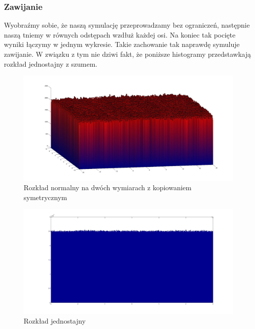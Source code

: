 \documentclass{mini}
\begin{document}
\subsubsection*{Zawijanie}
Wyobraźmy sobie, że naszą symulację przeprowadzamy bez ograniczeń, następnie naszą tniemy w równych odstępach wzdłuż każdej osi. Na koniec tak pocięte wyniki łączymy w jednym wykresie. Takie zachowanie tak naprawdę symuluje zawijanie. W związku z tym nie dziwi fakt, że poniższe histogramy przedstawkają rozkład jednostajny z szumem.
\begin{figure}[H]
\centering
\includegraphics[width=\textwidth]{w_n_10M_2__20_20__10_10_4_2}
\caption{Rozkład normalny na dwóch wymiarach z kopiowaniem symetrycznym}
\end{figure}

\begin{figure}[H]
\centering
\includegraphics[width=\textwidth]{w_j_20M_1__3_3}
\caption{Rozkład jednostajny}
\end{figure}
\end{document}
